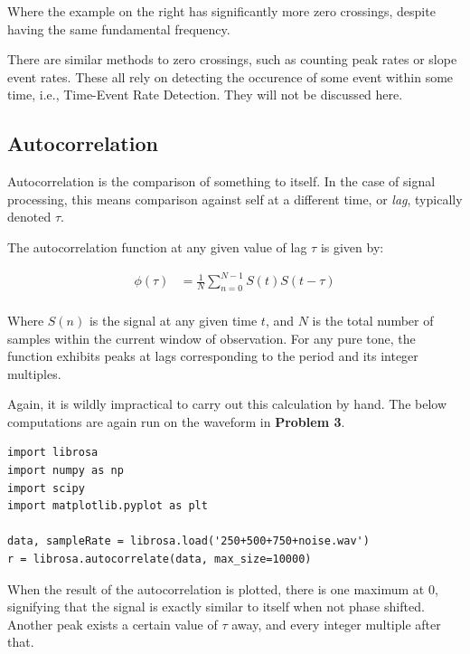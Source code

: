 \documentclass{article}
\begin{document}
Where the example on the right has significantly more zero crossings, despite having the same fundamental frequency.

There are similar methods to zero crossings, such as counting peak rates or slope event rates. These all rely on detecting the occurence of some event within some time, i.e., Time-Event Rate Detection\cite{Gerhard2003PitchTechniques}. They will not be discussed here.

\subsection{Autocorrelation}

Autocorrelation is the comparison of something to itself. In the case of signal processing, this means comparison against self at a different time, or \emph{lag}, typically denoted $\tau$.

The autocorrelation function at any given value of lag $\tau$ is given by\cite{Amado2008PitchNotes}:

\begin{align*}
    \phi(\tau) & = \frac{1}{N} \sum_{n=0}^{N-1} S(t)S(t-\tau) \\
\end{align*}

Where $S(n)$ is the signal at any given time $t$, and $N$ is the total number of samples within the current window of observation. For any pure tone, the function exhibits peaks at lags corresponding to the period and its integer multiples. 

Again, it is wildly impractical to carry out this calculation by hand. The below computations are again run on the waveform in \textbf{Problem 3}.

\begin{verbatim}
import librosa
import numpy as np
import scipy
import matplotlib.pyplot as plt

data, sampleRate = librosa.load('250+500+750+noise.wav')
r = librosa.autocorrelate(data, max_size=10000)
\end{verbatim}

When the result of the autocorrelation is plotted, there is one maximum at $0$, signifying that the signal is exactly similar to itself when not phase shifted. Another peak exists a certain value of $\tau$ away, and every integer multiple after that. 
\end{document}
